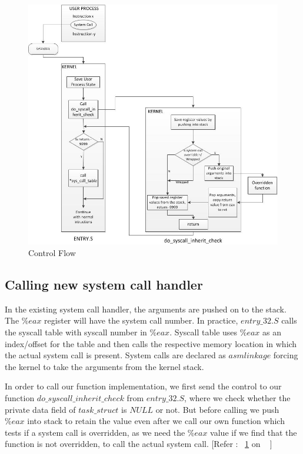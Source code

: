 \documentclass[11pt]{article}
\begin{document}
\begin{figure}[hb1]
  \centering
  \includegraphics[width=5in]{control.jpg}
  \caption{Control Flow}
  \label{fig:ControlFlow}
\end{figure}


\subsection{Calling new system call handler}

In the existing system call handler, the arguments are pushed on to
the stack. The $\%eax$ register will have the system call number. In practice, $entry\_32.S$
calls the syscall table with syscall number in $\%eax$. Syscall table uses $\%eax$
as an index/offset for the table and then calls the respective memory
location in which the actual system call is present. System calls are
declared as $asmlinkage$ forcing the kernel to take the arguments from
the kernel stack.

In order to call our function implementation, we first send the control to our function
$do\_syscall\_inherit\_check$  from  $entry\_32.S$, where we check whether the private data field of $task\_struct$ is $NULL$ or not. But before calling we push $\%eax$ into stack to retain the value even after we call
our own function which tests if a system call is overridden, as we
need the $\%eax$ value if we find that the function is not overridden, to call the actual system call.
[Refer : ~\ref{fig:ControlFlow} on ~\pageref{fig:ControlFlow} ]
\end{document}
